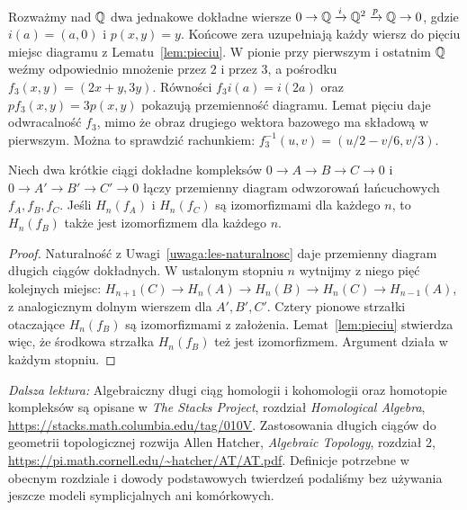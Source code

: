 \begin{przyklad}
Rozważmy nad $\mathbb{Q}$ dwa jednakowe dokładne wiersze
$0\to\mathbb{Q}\xrightarrow{i}\mathbb{Q}^2\xrightarrow{p}\mathbb{Q}\to0$,
gdzie $i(a)=(a,0)$ i $p(x,y)=y$.
Końcowe zera uzupełniają każdy wiersz do pięciu miejsc
diagramu z Lematu~\ref{lem:pieciu}.
W pionie przy pierwszym i ostatnim $\mathbb{Q}$ weźmy
odpowiednio mnożenie przez $2$ i przez $3$,
a pośrodku $f_3(x,y)=(2x+y,3y)$.
Równości $f_3i(a)=i(2a)$ oraz $pf_3(x,y)=3p(x,y)$
pokazują przemienność diagramu. Lemat pięciu daje
odwracalność $f_3$, mimo że obraz drugiego wektora
bazowego ma składową w pierwszym. Można to sprawdzić
rachunkiem: $f_3^{-1}(u,v)=(u/2-v/6,v/3)$.
\end{przyklad}

\begin{wniosek}
\label{wn:pieciu-ses-kompleksy}
Niech dwa krótkie ciągi dokładne kompleksów
$0\to A\to B\to C\to0$ i
$0\to A'\to B'\to C'\to0$ łączy przemienny diagram
odwzorowań łańcuchowych $f_A,f_B,f_C$.
Jeśli $H_n(f_A)$ i $H_n(f_C)$ są izomorfizmami
dla każdego $n$, to $H_n(f_B)$ także jest
izomorfizmem dla każdego $n$.
\end{wniosek}
\begin{proof}
Naturalność z Uwagi~\ref{uwaga:les-naturalnosc} daje
przemienny diagram długich ciągów dokładnych.
W ustalonym stopniu $n$ wytnijmy z niego pięć
kolejnych miejsc: $H_{n+1}(C)\to H_n(A)\to H_n(B)
\to H_n(C)\to H_{n-1}(A)$, z analogicznym
dolnym wierszem dla $A',B',C'$.
Cztery pionowe strzałki otaczające $H_n(f_B)$
są izomorfizmami z założenia. Lemat~\ref{lem:pieciu}
stwierdza więc, że środkowa strzałka $H_n(f_B)$
też jest izomorfizmem. Argument działa w każdym stopniu.
\end{proof}

\par\smallskip
{\footnotesize\noindent\emph{Dalsza lektura:}
Algebraiczny długi ciąg homologii i kohomologii
oraz homotopie kompleksów są opisane w
\emph{The Stacks Project}, rozdział
\emph{Homological Algebra},
\url{https://stacks.math.columbia.edu/tag/010V}.
Zastosowania długich ciągów do geometrii
topologicznej rozwija Allen Hatcher,
\emph{Algebraic Topology}, rozdział 2,
\url{https://pi.math.cornell.edu/~hatcher/AT/AT.pdf}.
Definicje potrzebne w obecnym rozdziale
i dowody podstawowych twierdzeń podaliśmy
bez używania jeszcze modeli
symplicjalnych ani komórkowych.\par}
\clearpage
